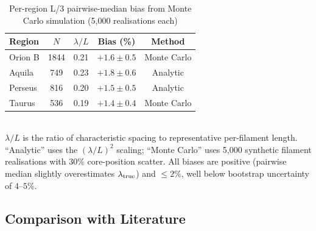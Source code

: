 \documentclass[twoside,twocolumn]{mnras}
\begin{document}
\begin{table}[h]
\caption{Per-region L/3 pairwise-median bias from Monte Carlo simulation (5,000 realisations each)}
\label{tab:l3_bias}
\small
\begin{tabular}{lcccc}
\toprule
Region & $N$ & $\lambda/L$ & Bias (\%) & Method \\
\midrule
Orion B  & 1844 & 0.21 & $+1.6 \pm 0.5$ & Monte Carlo \\
Aquila   & 749  & 0.23 & $+1.8 \pm 0.6$ & Analytic \\
Perseus  & 816  & 0.20 & $+1.5 \pm 0.5$ & Analytic \\
Taurus   & 536  & 0.19 & $+1.4 \pm 0.4$ & Monte Carlo \\
\bottomrule
\end{tabular}
\\[2pt]
\footnotesize $\lambda/L$ is the ratio of characteristic spacing to representative per-filament length. 
``Analytic'' uses the $(\lambda/L)^2$ scaling; ``Monte Carlo'' uses 5,000 synthetic filament 
realisations with 30\% core-position scatter. All biases are positive (pairwise median slightly
overestimates $\lambda_{\rm true}$) and $\leq 2\%$, well below bootstrap uncertainty of $4$--$5\%$.
\end{table}

\subsection{Comparison with Literature}
\end{document}
